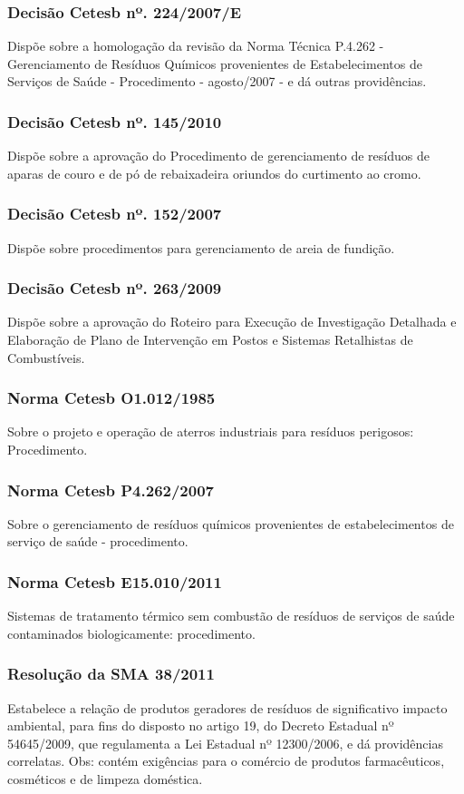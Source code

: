 \begin{subapend}
\begin{subsubapend}
		\subsubsection{Decisão Cetesb nº. 224/2007/E}
		Dispõe sobre a homologação da revisão da Norma Técnica P.4.262 - Gerenciamento de Resíduos Químicos provenientes de Estabelecimentos de Serviços de Saúde - Procedimento - agosto/2007 - e dá outras providências.
		\subsubsection{Decisão Cetesb nº. 145/2010}
		Dispõe sobre a aprovação do Procedimento de gerenciamento de resíduos de aparas de couro e de pó de rebaixadeira oriundos do curtimento ao cromo.
		\subsubsection{Decisão Cetesb nº. 152/2007}
		Dispõe sobre procedimentos para gerenciamento de areia de fundição.
		\subsubsection{Decisão Cetesb nº. 263/2009}
		Dispõe sobre a aprovação do Roteiro para Execução de Investigação Detalhada e Elaboração de Plano de Intervenção em Postos e Sistemas Retalhistas de Combustíveis.
		\subsubsection{Norma Cetesb O1.012/1985}
		Sobre o projeto e operação de aterros industriais para resíduos perigosos: Procedimento.
		\subsubsection{Norma Cetesb P4.262/2007}
		Sobre o gerenciamento de resíduos químicos provenientes de estabelecimentos de serviço de saúde - procedimento.
		\subsubsection{Norma Cetesb E15.010/2011}
		Sistemas de tratamento térmico sem combustão de resíduos de serviços de saúde contaminados biologicamente: procedimento.
		\subsubsection{Resolução da SMA 38/2011}
		Estabelece a relação de produtos geradores de resíduos de significativo impacto ambiental, para fins do disposto no artigo 19, do Decreto Estadual nº 54645/2009, que regulamenta a Lei Estadual nº 12300/2006, e dá providências correlatas. Obs: contém exigências para o comércio de produtos farmacêuticos, cosméticos e de limpeza doméstica.

\end{subsubapend}
\end{subapend}
